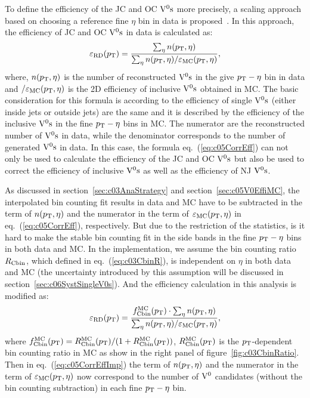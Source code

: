 To define the efficiency of the JC and OC ${\rm V}^{0}{\rm s}$ more precisely,
a scaling approach based on choosing a reference fine $\eta$ bin in data is
proposed~\cite{Zimmermann:AliPWGJE20140411}.
In this approach, the efficiency of JC and OC ${\rm V}^{0}{\rm s}$ in data is
calculated as:
\begin{equation}\label{eq:c05CorrEff}
\varepsilon_{\rm RD}(p_{\rm T})=
\frac{\sum_{\eta}n(p_{\rm T},\eta)}
     {\sum_{\eta}n(p_{\rm T},\eta)/\varepsilon_{\rm MC}(p_{\rm T},\eta)},
\end{equation}
where, $n(p_{\rm T},\eta)$ is the number of reconstructed ${\rm V}^{0}{\rm s}$ in the give
$p_{\rm T}-\eta$ bin in data and $/\varepsilon_{\rm MC}(p_{\rm T},\eta)$ is the 2D
efficiency of inclusive ${\rm V}^{0}{\rm s}$ obtained in MC.
The basic consideration for this formula is according to the
efficiency of single ${\rm V}^{0}{\rm s}$ (either inside jets or outside jets) are the
same and it is described by the efficiency of the inclusive ${\rm V}^{0}{\rm s}$ in the
fine $p_{\rm T}-\eta$ bins in MC.
The numerator are the reconstructed number of ${\rm V}^{0}{\rm s}$ in data,
while the denominator corresponds to the number of generated ${\rm V}^{0}{\rm s}$ in data.
In this case, the formula eq.~(\ref{eq:c05CorrEff}) can not only be used to
calculate the efficiency of the JC and OC ${\rm V}^{0}{\rm s}$ but also be used to
correct the efficiency of inclusive ${\rm V}^{0}{\rm s}$ as well as the efficiency
of NJ ${\rm V}^{0}{\rm s}$.

As discussed in section~\ref{sec:c03AnaStrategy} and
section~\ref{sec:c05V0EffiMC},
the interpolated bin counting fit results in data and MC have to be
subtracted in the term of $n(p_{\rm T},\eta)$ and the numerator
in the term of $\varepsilon_{\rm MC}(p_{\rm T},\eta)$ in eq.~(\ref{eq:c05CorrEff}),
respectively.
But due to the restriction of the statistics,
is it hard to make the stable bin counting fit in the side bands
in the fine $p_{\rm T}-\eta$ bins in both data and MC.
In the implementation, we assume the bin counting ratio $R_{\rm Cbin}$,
which defined in eq.~(\ref{eq:c03CbinR}),
is independent on $\eta$ in both data and
MC (the uncertainty introduced by this assumption will
be discussed in section~\ref{sec:c06SystSingleV0s}).
And the efficiency calculation in this analysis is modified as:
\begin{equation}\label{eq:c05CorrEffImp}
\varepsilon_{\rm RD}(p_{\rm T})=
\frac{f_{\rm Cbin}^{\rm MC}(p_{\rm T})\cdot\sum_{\eta}n(p_{\rm T},\eta)}
     {\sum_{\eta}n(p_{\rm T},\eta)/\varepsilon_{\rm MC}(p_{\rm T},\eta)},
\end{equation}
where $f_{\rm Cbin}^{\rm MC}(p_{\rm T})=
       R_{\rm Cbin}^{\rm MC}(p_{\rm T})/(1+R_{\rm Cbin}^{\rm MC}(p_{\rm T}))$,
$R_{\rm Cbin}^{\rm MC}(p_{\rm T})$ is the $p_{\rm T}$-dependent bin counting ratio
in MC as show in the right panel of figure~\ref{fig:c03CbinRatio}.
Then in eq.~(\ref{eq:c05CorrEffImp}) the term of $n(p_{\rm T},\eta)$ and the
numerator in the term of $\varepsilon_{\rm MC}(p_{\rm T},\eta)$ now correspond to
the number of ${\rm V}^{0}$ candidates (without the bin counting subtraction) in
each fine $p_{\rm T}-\eta$ bin.

